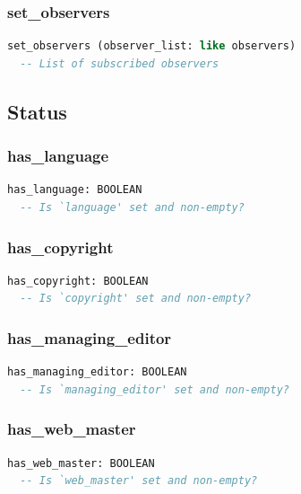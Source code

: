 \subsubsection{set\_observers}

\begin{lstlisting}[language=Eiffel]
set_observers (observer_list: like observers)
  -- List of subscribed observers
\end{lstlisting}


\subsection{Status}
\label{sec:channel-status}

\subsubsection{has\_language}

\begin{lstlisting}[language=Eiffel]
has_language: BOOLEAN
  -- Is `language' set and non-empty?
\end{lstlisting}

\subsubsection{has\_copyright}

\begin{lstlisting}[language=Eiffel]
has_copyright: BOOLEAN
  -- Is `copyright' set and non-empty?
\end{lstlisting}

\subsubsection{has\_managing\_editor}

\begin{lstlisting}[language=Eiffel]
has_managing_editor: BOOLEAN
  -- Is `managing_editor' set and non-empty?
\end{lstlisting}

\subsubsection{has\_web\_master}

\begin{lstlisting}[language=Eiffel]
has_web_master: BOOLEAN
  -- Is `web_master' set and non-empty?
\end{lstlisting}

